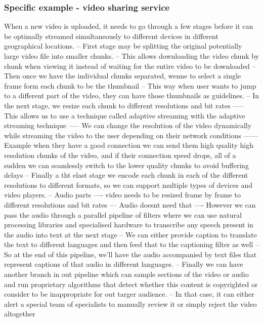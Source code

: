 \subsubsection{Specific example - video sharing service}
When a new video is uploaded, it needs to go through a few stages before it can be optimally streamed simultaneously to different devices in different geographical locations.
-- First stage may be splitting the original potentially large video file into smaller chunks.
-- This allows downloading the video chunk by chunk when viewing it instead of waiting for the entire video to be downloaded
-- Then once we have the individual chunks separated, wenne to select a single frame form each chunk to be the thumbnail
-- This way when user wants to jump to a different part of the video, they can have those thumbnails as guidelines.
-- In the next stage, we resize each chunk to different resolutions and bit rates
----- This allows us to use a technique called adaptive streaming with the adaptive streaming technique
----- We can change the resolution of the video dynamically while streaming the video to the user depending on their network conditions
------ Example when they have a good connection we can send them high quality high resolution chunks of the video, and if their connection speed drops, all of a sudden we can seamlessly switch to the lower quality chunks to avoid buffering delays
-- Finally a tht elast stage we encode each chunk in each of the different resolutions to different formats, so we can support multiple types of devices and video players.
-- Audio parts
---- video needs to be resized frame by frame to different resolutions and bit rates
--- Audio doesnt need that
---- However we can pass the audio through a parallel pipeline of filters where we can use natural processing libraries and specialised hardware to transcribe any speech present in the audio into text at the next stage
-- We can either provide caption to translate the text to different languages and then feed that to the captioning filter as well
-- So at the end of this pipeline, we'll have the audio accompanied by text files that represent captions of that audio in different languages.
-- Finally we can have another branch in out pipeline which can sample sections of the video or audio and run proprietary algorithms that detect whether this content is copyrighted or consider to be inappropriate for out targer audience.
-- In that case, it can either alert a special team of specialists to manually review it or simply reject the video altogether

